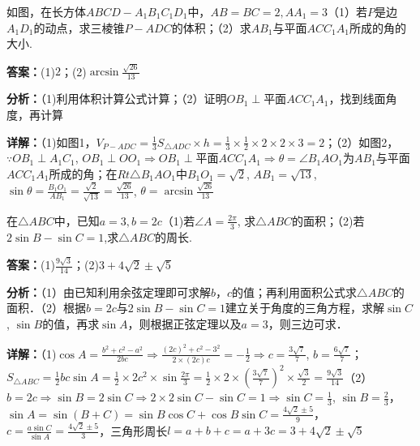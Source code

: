 \begin{question}[points=14]
如图，在长方体$ABCD-A_1B_1C_1D_1$中，$AB=BC=2, AA_1=3$（1）若$P$是边$A_1D_1$的动点，求三棱锥$P-ADC$的体积；（2）求$AB_1$与平面$ACC_1A_1$所成的角的大小.
\begin{solution}
\textbf{答案：}(1)$2$；(2)$\arcsin\frac{\sqrt{26}}{13}$

\textbf{分析：}（1)利用体积计算公式计算；（2）证明$OB_1\perp$平面$ACC_1A_1$，找到线面角度，再计算

\textbf{详解：}（1)如图1，$V_{P-ADC}=\frac{1}{3}S_{\triangle ADC}\times h=\frac{1}{3}\times\frac{1}{2}\times2\times2\times3=2$；（2）如图2，$\because OB_1\perp A_1C_1$, $OB_1\perp OO_1\Rightarrow OB_1\perp$平面$ACC_1A_1\Rightarrow \theta=\angle B_1AO_1$为$AB_1$与平面$ACC_1A_1$所成的角；在$Rt\triangle B_1AO_1$中$B_1O_1=\sqrt{2}$, $AB_1=\sqrt{13}$, $\sin\theta=\frac{B_1O_1}{AB_1}=\frac{\sqrt{2}}{\sqrt{13}}=\frac{\sqrt{26}}{13}$, $\theta=\arcsin\frac{\sqrt{26}}{13}$
\end{solution}
\end{question}

\begin{question}[points=14]
在$\triangle ABC$中，已知$a=3, b=2c$（1)若$\angle A=\frac{2\pi}{3}$, 求$\triangle ABC$的面积；（2)若$2\sin B-\sin C=1$,求$\triangle ABC$的周长.
\begin{solution}
\textbf{答案：}(1)$\frac{9\sqrt{3}}{14}$；(2)$3+4\sqrt{2}\pm\sqrt{5}$

\textbf{分析：}（1）由已知利用余弦定理即可求解$b$，$c$的值；再利用面积公式求$\triangle ABC$的面积．（2）根据$b=2c$与$2\sin B-\sin C=1$建立关于角度的三角方程，求解$\sin C$, $\sin B$的值，再求$\sin A$，则根据正弦定理以及$a=3$，则三边可求．

\textbf{详解：}（1)$\cos A=\frac{b^2+c^2-a^2}{2bc}\Rightarrow\frac{(2c)^2+c^2-3^2}{2\times(2c)c}=-\frac{1}{2}\Rightarrow c=\frac{3\sqrt{7}}{7}$, $b=\frac{6\sqrt{7}}{7}$；$S_{\triangle ABC}=\frac{1}{2}bc\sin A=\frac{1}{2}\times2c^2\times\sin\frac{2\pi}{3}=\frac{1}{2}\times2\times(\frac{3\sqrt{7}}{7})^2\times\frac{\sqrt{3}}{2}=\frac{9\sqrt{3}}{14}$（2）$b=2c\Rightarrow\sin B=2\sin C\Rightarrow2\times2\sin C-\sin C=1\Rightarrow\sin C=\frac{1}{3}$, $\sin B=\frac{2}{3}$，$\sin A=\sin(B+C)=\sin B\cos C+\cos B\sin C=\frac{4\sqrt{2}\pm5}{9}$，$c=\frac{a\sin C}{\sin A}=\frac{4\sqrt{2}\pm5}{3}$，三角形周长$l=a+b+c=a+3c=3+4\sqrt{2}\pm\sqrt{5}$
\end{solution}
\end{question}

